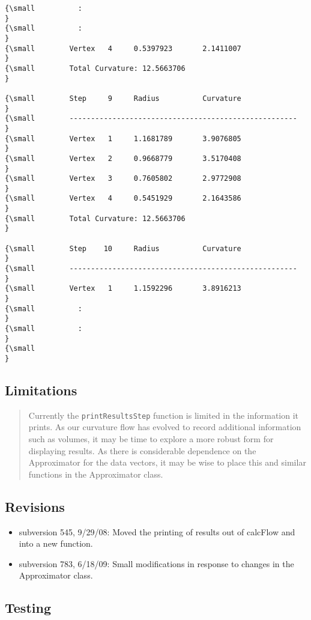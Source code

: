 \begin{verbatim}
{\small          :    
}
{\small          :
}
{\small        Vertex   4     0.5397923       2.1411007
}
{\small        Total Curvature: 12.5663706
}
 
{\small        Step     9     Radius          Curvature
}
{\small        -----------------------------------------------------
}
{\small        Vertex   1     1.1681789       3.9076805
}
{\small        Vertex   2     0.9668779       3.5170408
}
{\small        Vertex   3     0.7605802       2.9772908
}
{\small        Vertex   4     0.5451929       2.1643586
}
{\small        Total Curvature: 12.5663706
}
 
{\small        Step    10     Radius          Curvature
}
{\small        -----------------------------------------------------
}
{\small        Vertex   1     1.1592296       3.8916213
}
{\small          :
}
{\small          :
}
{\small   
}
\end{verbatim}

\subsection*{Limitations}

\begin{quotation}
Currently the \texttt{printResultsStep} function is limited in the
information it prints. As our curvature flow has evolved to record
additional information such as volumes, it may be time to explore a more
robust form for displaying results. As there is considerable dependence on
the Approximator for the data vectors, it may be wise to place this and
similar functions in the Approximator class.
\end{quotation}

\subsection*{Revisions}

\begin{itemize}
\item subversion 545, 9/29/08: Moved the printing of results out of calcFlow
and into a new function.

\item subversion 783, 6/18/09: Small modifications in response to changes in
the Approximator class.
\end{itemize}

\subsection*{Testing}

